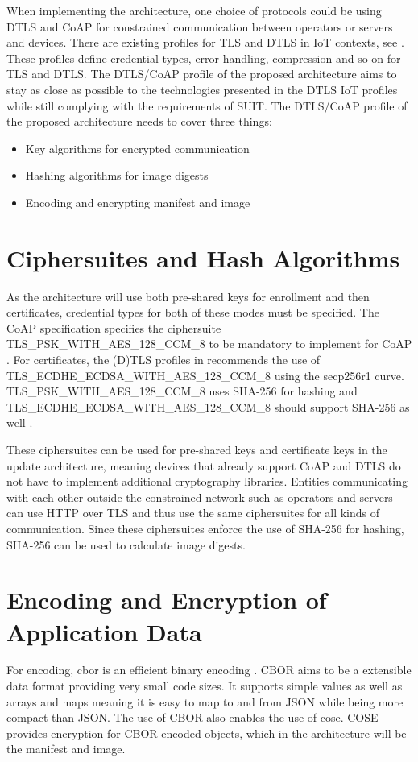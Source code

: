 \documentclass[0-thesis.tex]{subfiles}
\begin{document}
\label{chap:profiles}
When implementing the architecture, one choice of protocols could be using DTLS and CoAP
for constrained communication between operators or servers and devices. There are existing
profiles for TLS and DTLS in IoT contexts, see \parencite{rfc7925}. These profiles define
credential types, error handling, compression and so on for TLS and DTLS. The DTLS/CoAP
profile of the proposed architecture aims to stay as close as possible to the technologies
presented in the DTLS IoT profiles while still complying with the requirements of SUIT.
The DTLS/CoAP profile of the proposed architecture needs to cover three things:

\begin{itemize}
    \item Key algorithms for encrypted communication
    \item Hashing algorithms for image digests
    \item Encoding and encrypting manifest and image
\end{itemize}


\section{Ciphersuites and Hash Algorithms}
\label{sec:ciphersuites-hash}
As the architecture will use both pre-shared keys for enrollment and then certificates,
credential types for both of these modes must be specified. The CoAP specification
specifies the ciphersuite TLS\_PSK\_WITH\_AES\_128\_CCM\_8{} to be mandatory to implement
for CoAP \parencite{rfc7252}. For certificates, the (D)TLS profiles in \parencite{rfc7925}
recommends the use of TLS\_ECDHE\_ECDSA\_WITH\_AES\_128\_CCM\_8{} using the secp256r1
curve. TLS\_PSK\_WITH\_AES\_128\_CCM\_8{} uses SHA-256 for hashing and
TLS\_ECDHE\_ECDSA\_WITH\_AES\_128\_CCM\_8{} should support SHA-256 as well
\parencite{rfc7251}. 

These ciphersuites can be used for pre-shared keys and certificate keys in the update
architecture, meaning devices that already support CoAP and DTLS do not have to implement
additional cryptography libraries. Entities communicating with each other outside the
constrained network such as operators and servers can use HTTP over TLS and thus use the
same ciphersuites for all kinds of communication. Since these ciphersuites enforce the use
of SHA-256 for hashing, SHA-256 can be used to calculate image digests.

\section{Encoding and Encryption of Application Data}
\label{sec:encoding-encryption}
For encoding, \gls{cbor} is an efficient binary encoding \parencite{rfc7049}. CBOR aims to
be a extensible data format providing very small code sizes. It supports simple values as
well as arrays and maps meaning it is easy to map to and from JSON while being more
compact than JSON. The use of CBOR also enables the use of \gls{cose}. COSE provides
encryption for CBOR encoded objects, which in the architecture will be the manifest and
image.
\end{document}
